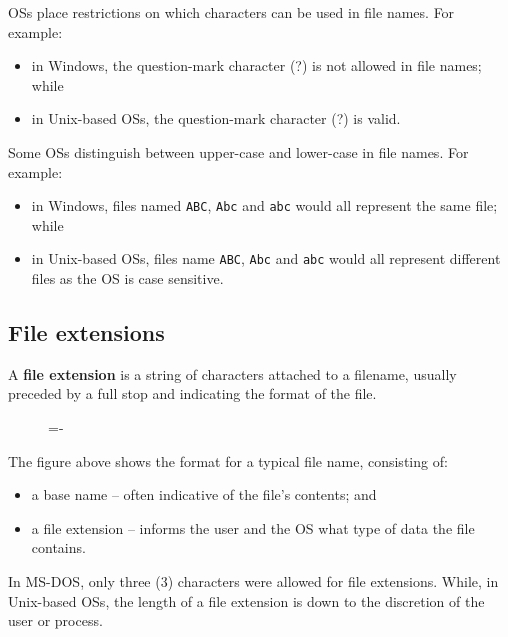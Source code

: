 \documentclass[a4paper]{systems-software}
\begin{document}
OSs place restrictions on which characters can be used in file names. For example:
\begin{itemize}
	\item in Windows, the question-mark character (?) is not allowed in file names; while
	\item in Unix-based OSs, the question-mark character (?) is valid.
\end{itemize}

Some OSs distinguish between upper-case and lower-case in file names. For example:
\begin{itemize}
	\item in Windows, files named \texttt{ABC}, \texttt{Abc} and \texttt{abc} would all represent the same file; while
	\item in Unix-based OSs, files name \texttt{ABC}, \texttt{Abc} and \texttt{abc} would all represent different files as the OS is case sensitive.
\end{itemize}


\subsection*{File extensions}

A \textbf{file extension} is a string of characters attached to a filename, usually preceded by a full stop and indicating the format of the file.

\begin{figure}[H]
  \lineskip=-\fboxrule
\end{figure}

The figure above shows the format for a typical file name, consisting of:
\begin{itemize}
	\item a base name -- often indicative of the file's contents; and
	\item a file extension -- informs the user and the OS what type of data the file contains.
\end{itemize}

In MS-DOS, only three (3) characters were allowed for file extensions. While, in Unix-based OSs, the length of a file extension is down to the discretion of the user or process.
\end{document}
